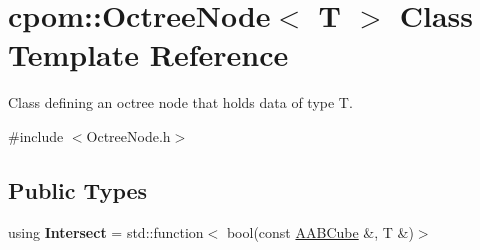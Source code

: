 \hypertarget{classcpom_1_1_octree_node}{}\section{cpom\+:\+:Octree\+Node$<$ T $>$ Class Template Reference}
\label{classcpom_1_1_octree_node}


Class defining an octree node that holds data of type T.  




{\ttfamily \#include $<$Octree\+Node.\+h$>$}

\subsection*{Public Types}
\begin{DoxyCompactItemize}
\item 
using {\bfseries Intersect} = std\+::function$<$ bool(const \hyperlink{structcpom_1_1_a_a_b_cube}{A\+A\+B\+Cube} \&, T \&)$>$\hypertarget{classcpom_1_1_octree_node_ae7be22165931dd27e9c93517c4466b61}{}\label{classcpom_1_1_octree_node_ae7be22165931dd27e9c93517c4466b61}

\end{DoxyCompactItemize}
